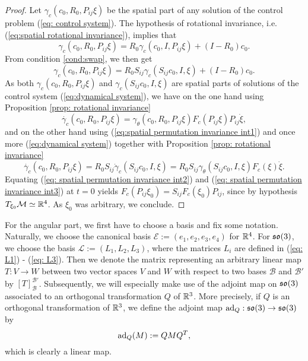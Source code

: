 \begin{proof}
Let $\gamma_c(c_0, R_0, P_{ij} \xi)$ be the spatial part of any solution of the control problem (\ref{eq: control system}). The hypothesis of rotational invariance, i.e. (\ref{eq:spatial rotational invariance}), implies that
\begin{equation}
	\gamma_c(c_0, R_0, P_{ij} \xi) = R_0 \gamma_c(c_0, I, P_{ij} \xi) + (I - R_0)c_0.
\end{equation}
From condition \ref{cond:swap}, we then get
\begin{equation}
\label{eq:spatial permutation invariance int1}
	\gamma_c(c_0, R_0, P_{ij}\xi) = R_0 S_{ij} \gamma_c(S_{ij} c_0, I, \xi) + (I - R_0)c_0.
\end{equation}
As both $\gamma_c(c_0, R_0, P_{ij} \xi)$ and $\gamma_c(S_{ij} c_0, I, \xi)$ are spatial parts of solutions of the control system (\ref{eq:dynamical system}), we have on the one hand using Proposition \ref{prop: rotational invariance}
\begin{equation}
\label{eq: spatial permutation invariance int2}
	\dot{\gamma_c}(c_0, R_0, P_{ij} \xi) = \gamma_{\theta}(c_0, R_0, P_{ij} \xi) F_c(P_{ij} \xi) P_{ij} \dot{\xi},
\end{equation}
and on the other hand using (\ref{eq:spatial permutation invariance int1}) and once more (\ref{eq:dynamical system}) together with Proposition \ref{prop: rotational invariance}
\begin{equation}
\label{eq: spatial permutation invariance int3}
	\dot{\gamma_c}(c_0, R_0, P_{ij} \xi) = R_0 S_{ij} \dot{\gamma}_c(S_{ij} c_0, I, \xi) = R_0 S_{ij} \gamma_\theta(S_{ij} c_0, I, \xi) F_c(\xi) \dot{\xi}.
\end{equation}
Equating (\ref{eq: spatial permutation invariance int2}) and (\ref{eq: spatial permutation invariance int3}) at $t = 0$ yields $ F_c(P_{ij} \xi_0) = S_{ij} F_c(\xi_0) P_{ij}$, since by hypothesis $T_{\xi_0} \mathcal{M} \simeq \mathbb{R}^4$. As $\xi_0$ was arbitrary, we conclude.
\end{proof}

For the angular part, we first have to choose a basis and fix some notation. Naturally, we choose the canonical basis $\mathcal{E} := (e_1, e_2, e_3, e_4)$ for $\mathbb{R}^4$. For $\mathfrak{so}(3)$, we choose the basis $\mathcal{L} := (L_1, L_2, L_3)$, where the matrices $L_i$ are defined in (\ref{eq: L1}) - (\ref{eq: L3}). Then we denote the matrix representing an arbitrary linear map $T: V \to W$ between two vector spaces $V$ and $W$ with respect to two bases $\mathcal{B}$ and $\mathcal{B}'$ by $[T]_{\mathcal{B}}^{\mathcal{B}'}$. Subsequently, we will especially make use of the adjoint map on $\mathfrak{so}(3)$ associated to an orthogonal transformation $Q$ of $\mathbb{R}^3$. More precisely, if $Q$ is an orthogonal transformation of $\mathbb{R}^3$, we define the adjoint map $\operatorname{ad}_Q : \mathfrak{so}(3) \to \mathfrak{so}(3)$ by
\begin{equation}
\operatorname{ad}_Q(M) := Q M Q^T,
\end{equation}
which is clearly a linear map.

